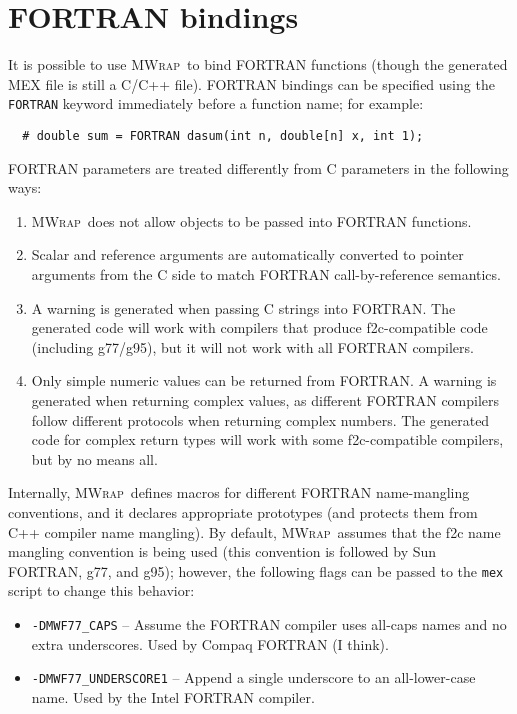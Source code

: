 \documentclass[12pt]{article}
\newcommand{\mwrap}{\textsc{MWrap}}
\begin{document}
\section{FORTRAN bindings}

It is possible to use \mwrap\ to bind FORTRAN functions (though the
generated MEX file is still a C/C++ file).  FORTRAN bindings can be
specified using the {\tt FORTRAN} keyword immediately before a function
name; for example:
\begin{verbatim}
  # double sum = FORTRAN dasum(int n, double[n] x, int 1);
\end{verbatim}

FORTRAN parameters are treated differently from C parameters in the
following ways:
\begin{enumerate}
\item
  \mwrap\ does not allow objects to be passed into FORTRAN functions.
\item
  Scalar and reference arguments are automatically converted to pointer
  arguments from the C side to match FORTRAN call-by-reference semantics.
\item
  A warning is generated when passing C strings into FORTRAN.  The generated
  code will work with compilers that produce f2c-compatible code (including
  g77/g95), but it will not work with all FORTRAN compilers.
\item
  Only simple numeric values can be returned from FORTRAN.  A warning is
  generated when returning complex values, as different FORTRAN compilers
  follow different protocols when returning complex numbers.  The generated
  code for complex return types will work with some f2c-compatible compilers, 
  but by no means all.
\end{enumerate}

Internally, \mwrap\ defines macros for different FORTRAN name-mangling
conventions, and it declares appropriate prototypes (and protects them
from C++ compiler name mangling).  By default, \mwrap\ assumes that
the f2c name mangling convention is being used (this convention is
followed by Sun FORTRAN, g77, and g95); however, the following flags
can be passed to the {\tt mex} script to change this behavior:
\begin{itemize}
\item
  {\tt -DMWF77\_CAPS} -- Assume the FORTRAN compiler uses all-caps
  names and no extra underscores.  Used by Compaq FORTRAN (I think).
\item
  {\tt -DMWF77\_UNDERSCORE1} -- Append a single underscore to an
  all-lower-case name.  Used by the Intel FORTRAN compiler.
\end{itemize}
\end{document}
